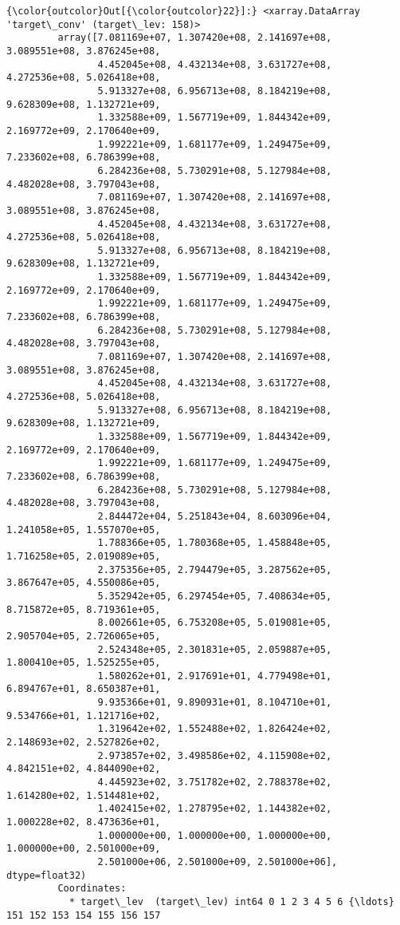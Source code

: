 \documentclass[11pt]{article}
\begin{document}
\begin{Verbatim}[commandchars=\\\{\}]
{\color{outcolor}Out[{\color{outcolor}22}]:} <xarray.DataArray 'target\_conv' (target\_lev: 158)>
         array([7.081169e+07, 1.307420e+08, 2.141697e+08, 3.089551e+08, 3.876245e+08,
                4.452045e+08, 4.432134e+08, 3.631727e+08, 4.272536e+08, 5.026418e+08,
                5.913327e+08, 6.956713e+08, 8.184219e+08, 9.628309e+08, 1.132721e+09,
                1.332588e+09, 1.567719e+09, 1.844342e+09, 2.169772e+09, 2.170640e+09,
                1.992221e+09, 1.681177e+09, 1.249475e+09, 7.233602e+08, 6.786399e+08,
                6.284236e+08, 5.730291e+08, 5.127984e+08, 4.482028e+08, 3.797043e+08,
                7.081169e+07, 1.307420e+08, 2.141697e+08, 3.089551e+08, 3.876245e+08,
                4.452045e+08, 4.432134e+08, 3.631727e+08, 4.272536e+08, 5.026418e+08,
                5.913327e+08, 6.956713e+08, 8.184219e+08, 9.628309e+08, 1.132721e+09,
                1.332588e+09, 1.567719e+09, 1.844342e+09, 2.169772e+09, 2.170640e+09,
                1.992221e+09, 1.681177e+09, 1.249475e+09, 7.233602e+08, 6.786399e+08,
                6.284236e+08, 5.730291e+08, 5.127984e+08, 4.482028e+08, 3.797043e+08,
                7.081169e+07, 1.307420e+08, 2.141697e+08, 3.089551e+08, 3.876245e+08,
                4.452045e+08, 4.432134e+08, 3.631727e+08, 4.272536e+08, 5.026418e+08,
                5.913327e+08, 6.956713e+08, 8.184219e+08, 9.628309e+08, 1.132721e+09,
                1.332588e+09, 1.567719e+09, 1.844342e+09, 2.169772e+09, 2.170640e+09,
                1.992221e+09, 1.681177e+09, 1.249475e+09, 7.233602e+08, 6.786399e+08,
                6.284236e+08, 5.730291e+08, 5.127984e+08, 4.482028e+08, 3.797043e+08,
                2.844472e+04, 5.251843e+04, 8.603096e+04, 1.241058e+05, 1.557070e+05,
                1.788366e+05, 1.780368e+05, 1.458848e+05, 1.716258e+05, 2.019089e+05,
                2.375356e+05, 2.794479e+05, 3.287562e+05, 3.867647e+05, 4.550086e+05,
                5.352942e+05, 6.297454e+05, 7.408634e+05, 8.715872e+05, 8.719361e+05,
                8.002661e+05, 6.753208e+05, 5.019081e+05, 2.905704e+05, 2.726065e+05,
                2.524348e+05, 2.301831e+05, 2.059887e+05, 1.800410e+05, 1.525255e+05,
                1.580262e+01, 2.917691e+01, 4.779498e+01, 6.894767e+01, 8.650387e+01,
                9.935366e+01, 9.890931e+01, 8.104710e+01, 9.534766e+01, 1.121716e+02,
                1.319642e+02, 1.552488e+02, 1.826424e+02, 2.148693e+02, 2.527826e+02,
                2.973857e+02, 3.498586e+02, 4.115908e+02, 4.842151e+02, 4.844090e+02,
                4.445923e+02, 3.751782e+02, 2.788378e+02, 1.614280e+02, 1.514481e+02,
                1.402415e+02, 1.278795e+02, 1.144382e+02, 1.000228e+02, 8.473636e+01,
                1.000000e+00, 1.000000e+00, 1.000000e+00, 1.000000e+00, 2.501000e+09,
                2.501000e+06, 2.501000e+09, 2.501000e+06], dtype=float32)
         Coordinates:
           * target\_lev  (target\_lev) int64 0 1 2 3 4 5 6 {\ldots} 151 152 153 154 155 156 157
\end{Verbatim}
            
\end{document}
